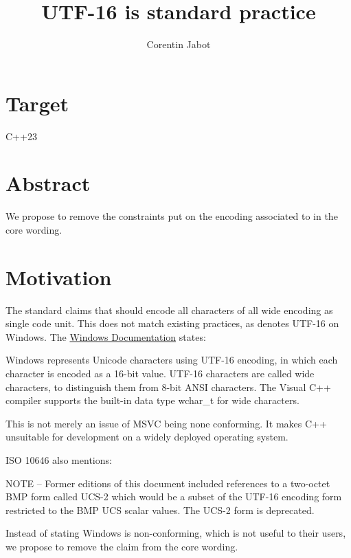\documentclass{wg21}
\title{UTF-16 is standard practice}
\author{Corentin Jabot}{corentin.jabot@gmail.com}
\begin{document}
\maketitle

\section{Target}

C++23

\section{Abstract}

We propose to remove the constraints put on the encoding associated to  in the core wording.

\section{Motivation}

The standard claims that  should encode all characters of all wide encoding
as single code unit.
This does not match existing practices, as  denotes UTF-16 on Windows.
The \href{https://docs.microsoft.com/en-us/windows/win32/learnwin32/working-with-strings}{Windows Documentation} states:

\begin{quoteblock}
Windows represents Unicode characters using UTF-16 encoding, in which each character is encoded as a 16-bit value. UTF-16 characters are called wide characters, to distinguish them from 8-bit ANSI characters. The Visual C++ compiler supports the built-in data type wchar_t for wide characters.
\end{quoteblock}

This is not merely an issue of MSVC being none conforming.
It makes C++ unsuitable for development on a widely deployed operating system.


ISO 10646 also mentions:

\begin{quoteblock}
NOTE – Former editions of this document included references to a two-octet BMP form called UCS-2 which would be a subset of the
UTF-16  encoding form restricted to the BMP UCS scalar values. The UCS-2 form is deprecated.
\end{quoteblock}


Instead of stating Windows is non-conforming, which is not useful to their users, we propose to remove the claim
from the core wording.
\end{document}
